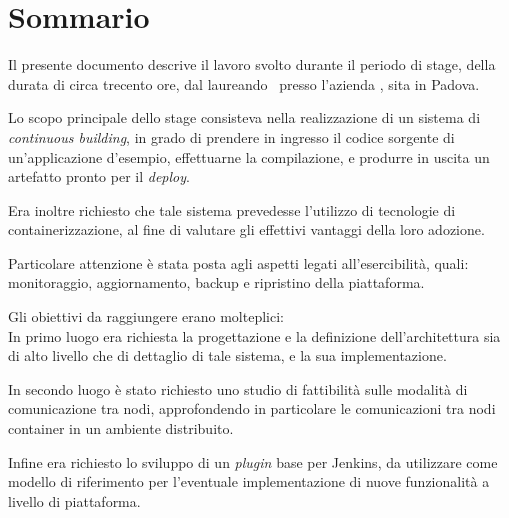 
\cleardoublepage
{}
{}
\begingroup
\let\clearpage\relax
\let\cleardoublepage\relax
\let\cleardoublepage\relax

\chapter*{Sommario}

Il presente documento descrive il lavoro svolto durante il periodo di stage, della durata di circa trecento ore, dal laureando \myName\ presso l'azienda \myCompany, sita in Padova.\setlength{\parskip}{6pt}

Lo scopo principale dello stage consisteva nella realizzazione di un sistema di \textit{\gls{continuous building}}, in grado di prendere in ingresso il codice sorgente di un'applicazione d'esempio, effettuarne la compilazione, e produrre in uscita un \gls{artefatto} pronto per il \textit{\gls{deploy}}.

Era inoltre richiesto che tale sistema prevedesse l'utilizzo di tecnologie di containerizzazione, al fine di valutare gli effettivi vantaggi della loro adozione.

Particolare attenzione è stata posta agli aspetti legati all'esercibilità, quali: monitoraggio, aggiornamento, backup e ripristino della piattaforma.\setlength{\parskip}{6pt}

Gli obiettivi da raggiungere erano molteplici:\\
In primo luogo era richiesta la progettazione e la definizione dell'architettura sia di alto livello che di dettaglio di tale sistema, e la sua implementazione.

In secondo luogo è stato richiesto uno studio di fattibilità sulle modalità di comunicazione tra nodi, approfondendo in particolare le comunicazioni tra nodi container in un ambiente distribuito.

Infine era richiesto lo sviluppo di un \textit{\gls{plugin}} base per Jenkins\cite{site:extend-jenkins}\cite{site:jenkins-plugin-structure}\cite{site:jenkins-plugin-tutorial}, da utilizzare come modello di riferimento per l'eventuale implementazione di nuove funzionalità a livello di piattaforma.

%
%

\endgroup			

\vfill

